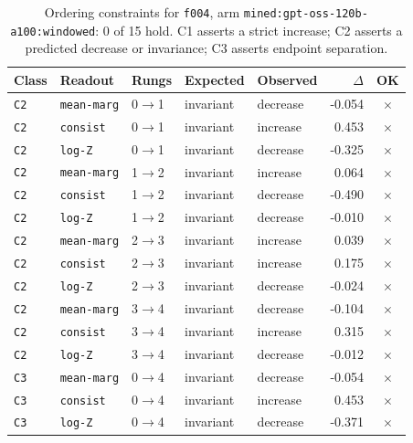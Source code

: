\documentclass[11pt]{article}
\begin{document}
\begin{table}[htbp]
\centering
\small
\caption{Ordering constraints for \texttt{f004}, arm \texttt{mined:gpt-oss-120b-a100:windowed}: 0 of 15 hold. C1 asserts a strict increase; C2 asserts a predicted decrease or invariance; C3 asserts endpoint separation.}
\label{tab:ladder-f004-mined-gpt-oss-120b-a100-windowed}
\begin{tabular}{lllllrc}
\toprule
Class & Readout & Rungs & Expected & Observed & $\Delta$ & OK \\
\midrule
\texttt{C2} & \texttt{mean-marg} & 0$\to$1 & invariant & decrease & -0.054 & $\times$ \\
\texttt{C2} & \texttt{consist} & 0$\to$1 & invariant & increase & 0.453 & $\times$ \\
\texttt{C2} & \texttt{log-Z} & 0$\to$1 & invariant & decrease & -0.325 & $\times$ \\
\texttt{C2} & \texttt{mean-marg} & 1$\to$2 & invariant & increase & 0.064 & $\times$ \\
\texttt{C2} & \texttt{consist} & 1$\to$2 & invariant & decrease & -0.490 & $\times$ \\
\texttt{C2} & \texttt{log-Z} & 1$\to$2 & invariant & decrease & -0.010 & $\times$ \\
\texttt{C2} & \texttt{mean-marg} & 2$\to$3 & invariant & increase & 0.039 & $\times$ \\
\texttt{C2} & \texttt{consist} & 2$\to$3 & invariant & increase & 0.175 & $\times$ \\
\texttt{C2} & \texttt{log-Z} & 2$\to$3 & invariant & decrease & -0.024 & $\times$ \\
\texttt{C2} & \texttt{mean-marg} & 3$\to$4 & invariant & decrease & -0.104 & $\times$ \\
\texttt{C2} & \texttt{consist} & 3$\to$4 & invariant & increase & 0.315 & $\times$ \\
\texttt{C2} & \texttt{log-Z} & 3$\to$4 & invariant & decrease & -0.012 & $\times$ \\
\texttt{C3} & \texttt{mean-marg} & 0$\to$4 & invariant & decrease & -0.054 & $\times$ \\
\texttt{C3} & \texttt{consist} & 0$\to$4 & invariant & increase & 0.453 & $\times$ \\
\texttt{C3} & \texttt{log-Z} & 0$\to$4 & invariant & decrease & -0.371 & $\times$ \\
\bottomrule
\end{tabular}
\end{table}
\end{document}
